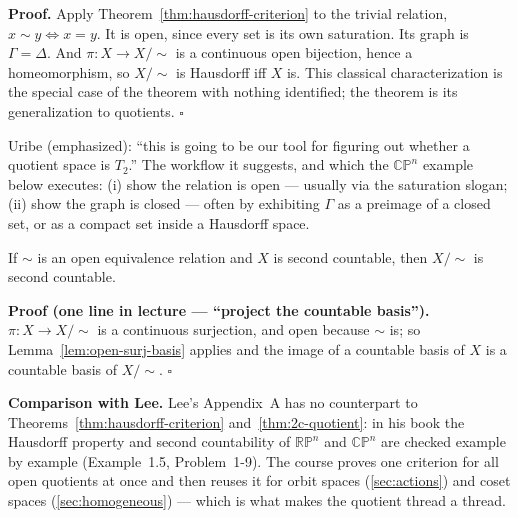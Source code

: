\documentclass[11pt]{report}
\makeatletter
\newcounter{thmcounter}[section]
\renewenvironment{proof}[1][Proof]{\noindent\textbf{#1.} }{\hfill$\square$\par\vspace{5pt}}
\newcommand{\thmlabel}[1]{\edef\@currentlabel{\arabic{section}.\arabic{thmcounter}}\label{#1}}
\newcommand{\leeref}[1]{\par\smallskip{\raggedleft\footnotesize\textsc{Lee}:\ #1\par}}
\makeatother
\begin{document}
\begin{proof}
Apply Theorem~\ref{thm:hausdorff-criterion} to the trivial relation, $x \sim y \iff x = y$. It is open, since every set is its own saturation. Its graph is $\Gamma = \Delta$. And $\pi : X \to X/{\sim}$ is a continuous open bijection, hence a homeomorphism, so $X/{\sim}$ is Hausdorff iff $X$ is. This classical characterization is the special case of the theorem with nothing identified; the theorem is its generalization to quotients.
\end{proof}
\begin{rembox}\label{rem:this-tool}
Uribe (emphasized): ``this is going to be our tool for figuring out whether a quotient space is $T_2$.'' The workflow it suggests, and which the $\mathbb{CP}^n$ example below executes: (i) show the relation is open --- usually via the saturation slogan; (ii) show the graph is closed --- often by exhibiting $\Gamma$ as a preimage of a closed set, or as a compact set inside a Hausdorff space.
\end{rembox}

\begin{thmbox}\thmlabel{thm:2c-quotient}
If $\sim$ is an open equivalence relation and $X$ is second countable, then $X/{\sim}$ is second countable.
\leeref{no counterpart; a course result}
\end{thmbox}

\begin{proof}[Proof (one line in lecture --- ``project the countable basis'')]
$\pi : X \to X/{\sim}$ is a continuous surjection, and open because $\sim$ is; so Lemma~\ref{lem:open-surj-basis} applies and the image of a countable basis of $X$ is a countable basis of $X/{\sim}$.
\end{proof}

\textbf{Comparison with Lee.} Lee's Appendix~A has no counterpart to Theorems~\ref{thm:hausdorff-criterion} and~\ref{thm:2c-quotient}: in his book the Hausdorff property and second countability of $\mathbb{RP}^n$ and $\mathbb{CP}^n$ are checked example by example (Example~1.5, Problem~1-9). The course proves one criterion for all open quotients at once and then reuses it for orbit spaces (\ref{sec:actions}) and coset spaces (\ref{sec:homogeneous}) --- which is what makes the quotient thread a thread.
\end{document}
